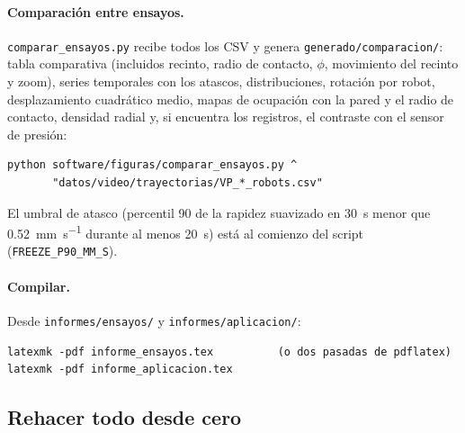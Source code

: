\paragraph{Comparación entre ensayos.} \texttt{comparar\_ensayos.py} recibe todos los CSV y genera
\nolinkurl{generado/comparacion/}: tabla comparativa (incluidos recinto, radio de contacto, $\phi$,
movimiento del recinto y zoom), series temporales con los atascos, distribuciones, rotación por robot,
desplazamiento cuadrático medio, mapas de ocupación con la pared y el radio de contacto, densidad radial
y, si encuentra los registros, el contraste con el sensor de presión:
\begin{verbatim}
python software/figuras/comparar_ensayos.py ^
       "datos/video/trayectorias/VP_*_robots.csv"
\end{verbatim}
El umbral de atasco (percentil 90 de la rapidez suavizado en \SI{30}{\second} menor que
\SI{0.52}{\milli\metre\per\second} durante al menos \SI{20}{\second}) está al comienzo del script
(\texttt{FREEZE\_P90\_MM\_S}).

\paragraph{Compilar.} Desde \nolinkurl{informes/ensayos/} y \nolinkurl{informes/aplicacion/}:
\begin{verbatim}
latexmk -pdf informe_ensayos.tex          (o dos pasadas de pdflatex)
latexmk -pdf informe_aplicacion.tex
\end{verbatim}

\subsection{Rehacer todo desde cero}

